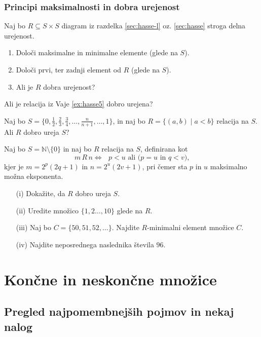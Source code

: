 \documentclass[11pt,paper=b5,footinclude,headinclude]{scrbook} %
\newtheorem{ex}{Vaja\hypertarget{sol:\theex}}[chapter]
\begin{document}
    \subsection{Principi maksimalnosti in dobra urejenost}
    \begin{ex}
    Naj bo $R\subseteq S\times S$ diagram iz razdelka \ref{sec:hasse-l} oz. \ref{sec:hasse} stroga delna urejenost.
    \begin{enumerate}
        \item Določi maksimalne in minimalne elemente (glede na $S$).
        \item Določi prvi, ter zadnji element od $R$  (glede na $S$).
        \item Ali je $R$ dobra urejenost?
    \end{enumerate}
\end{ex}
    \begin{ex}
        Ali je relacija iz Vaje \ref{ex:hasse5} dobro urejena? 
    \end{ex}
    \begin{ex} Naj bo $S= \{0,\frac{1}{2}, \frac{2}{3}, \frac{3}{4}, \ldots, \frac{n}{n+1}, \ldots, 1\}$, in naj bo $R=\{(a,b)\mid a<b\}$ relacija na $S$. Ali $R$ dobro ureja $S$?
	
	\end{ex} \begin{ex} Naj bo $S = \mathbb{N}\setminus \{0\}$ in naj bo  $R$ relacija na $S$, definirana kot 
	$$m\, R\, n \Leftrightarrow  \textrm{ $p< u$ ali ($p=u$ in $q < v$),} $$
	kjer je $m=2^p(2q+1)$ in $n=2^u(2v+1)$, pri čemer sta $p$ in $u$ maksimalno možna eksponenta.
	\begin{enumerate}
		\item[(i)] Dokažite, da $R$ dobro ureja $S$.
		\item[(ii)] Uredite množico $\{1,2\ldots, 10\}$ glede na $R$.
		\item[(iii)] Naj bo $C= \{50, 51, 52, \ldots\}$. Najdite $R$-minimalni element množice $C$.
		\item[(iv)] Najdite neposrednega naslednika števila $96$.
	\end{enumerate}
\end{ex}




\chapter{Končne in neskončne množice}

\section{Pregled najpomembnejših pojmov in nekaj nalog}
\end{document}
